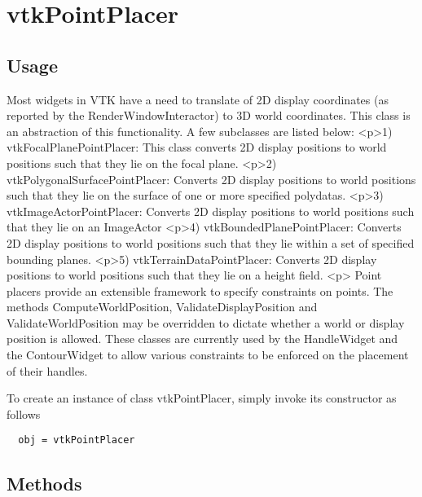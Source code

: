 \section{vtkPointPlacer}

\subsection{Usage}

 Most widgets in VTK have a need to translate of 2D display coordinates (as
 reported by the RenderWindowInteractor) to 3D world coordinates. This class
 is an abstraction of this functionality. A few subclasses are listed below:
 <p>1) vtkFocalPlanePointPlacer: This class converts 2D display positions to 
 world positions such that they lie on the focal plane.
 <p>2) vtkPolygonalSurfacePointPlacer: Converts 2D display positions to 
 world positions such that they lie on the surface of one or more specified 
 polydatas.
 <p>3) vtkImageActorPointPlacer: Converts 2D display positions to world 
 positions such that they lie on an ImageActor
 <p>4) vtkBoundedPlanePointPlacer: Converts 2D display positions to world 
 positions such that they lie within a set of specified bounding planes.
 <p>5) vtkTerrainDataPointPlacer: Converts 2D display positions to world 
 positions such that they lie on a height field.
 <p> Point placers provide an extensible framework to specify constraints on 
 points. The methods ComputeWorldPosition, ValidateDisplayPosition and
 ValidateWorldPosition may be overridden to dictate whether a world or
 display position is allowed. These classes are currently used by the
 HandleWidget and the ContourWidget to allow various constraints to be 
 enforced on the placement of their handles.

To create an instance of class vtkPointPlacer, simply
invoke its constructor as follows
\begin{verbatim}
  obj = vtkPointPlacer
\end{verbatim}
\subsection{Methods}

